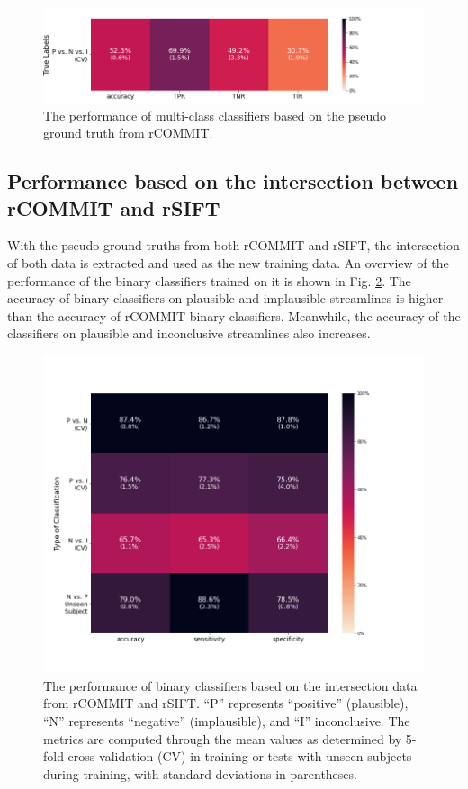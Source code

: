 \begin{figure}[ht]
    \centering
    \includegraphics[width= 12cm]{figures/multi_class_critiaria.png}
    \caption{The performance of multi-class classifiers based on the pseudo ground truth from rCOMMIT.
    }
\label{fig:multi_classifiers_critiaria}
\end{figure}


\subsection{Performance based on the intersection between rCOMMIT and rSIFT}
With the pseudo ground truths from both rCOMMIT and rSIFT, the intersection of both data is extracted and used as the new training data.
An overview of the performance of the binary classifiers trained on it is shown in Fig. \ref{fig:inter_classifiers}.
The accuracy of binary classifiers on plausible and implausible streamlines is higher than the accuracy of rCOMMIT binary classifiers.
Meanwhile, the accuracy of the classifiers on plausible and inconclusive streamlines also increases.

\begin{figure}[ht]
    \centering
    \includegraphics[width= 12cm]{figures/inter_classifiers.png}
    \caption{The performance of binary classifiers based on the intersection data from rCOMMIT and rSIFT.
    “P” represents “positive” (plausible),  “N” represents “negative” (implausible), and “I” inconclusive. 
    The metrics are computed through the mean values as determined by 5-fold cross-validation (CV) in training or tests with unseen subjects during training, 
    with standard deviations in parentheses.}
\label{fig:inter_classifiers}
\end{figure}
